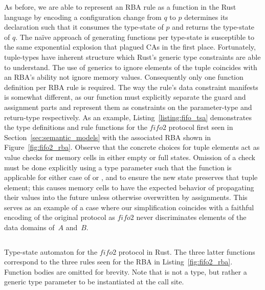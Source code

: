 As before, we are able to represent an RBA rule as a function in the Rust language by encoding a configuration change from $q$ to $p$ determines its declaration such that it consumes the type-state of $p$ and returns the type-state of $q$. The na{\"i}ve approach of generating functions per type-state is susceptible to the same exponential explosion that plagued CAs in the first place. Fortunately, tuple-types have inherent structure which Rust's generic type constraints are able to understand. The use of generics to ignore elements of the tuple coincides with an RBA's ability not ignore memory values. Consequently only one function definition per RBA rule is required. The way the rule's data constraint manifests is somewhat different, as our function must explicitly separate the guard and assignment parts and represent them as constraints on the parameter-type and return-type respectively. As an example, Listing~\ref{listing:fifo_tsa} demonstrates the type definitions and rule functions for the $fifo2$ protocol first seen in Section~\ref{sec:semantic_models} with the associated RBA shown in Figure~\ref{fig:fifo2_rba}. Observe that the concrete choices for tuple elements act as value checks for memory cells in either empty or full states. Omission of a check must be done explicitly using a type parameter such that the function is applicable for either case of  or , and to ensure the new state preserves that tuple element; this causes memory cells to have the expected behavior of propagating their values into the future unless otherwise overwritten by assignments. This serves as an example of a case where our simplification coincides with a faithful encoding of the original protocol as $fifo2$ never discriminates elements of the data domains of~$A$ and~$B$.


\begin{listing}[ht]
	\inputminted[]{rust}{fifo_tsa.rs}
	\caption[Type state automaton in Rust for the fifo2 connector.]{Type-state automaton for the $fifo2$ protocol in Rust. The three latter functions correspond to the three rules seen for the RBA in Listing~\ref{fig:fifo2_rba}. Function bodies are omitted for brevity. Note that  is not a type, but rather a generic type parameter to be instantiated at the call site.}
	\label{listing:fifo_tsa}
\end{listing}




